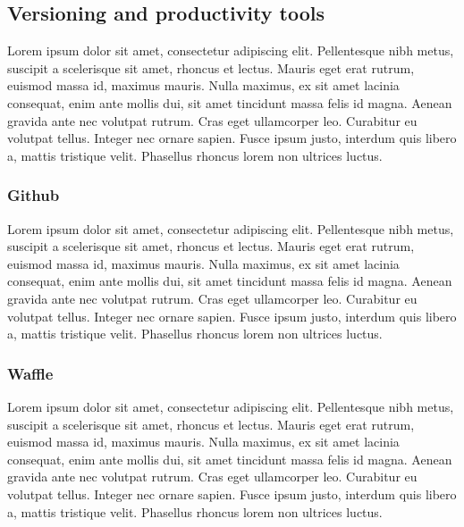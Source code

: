 \subsection{Versioning and productivity tools}\label{subsec:versioningsystem}
Lorem ipsum dolor sit amet, consectetur adipiscing elit. Pellentesque nibh metus, suscipit a scelerisque sit amet, rhoncus et lectus. Mauris eget erat rutrum, euismod massa id, maximus mauris. Nulla maximus, ex sit amet lacinia consequat, enim ante mollis dui, sit amet tincidunt massa felis id magna. Aenean gravida ante nec volutpat rutrum. Cras eget ullamcorper leo. Curabitur eu volutpat tellus. Integer nec ornare sapien. Fusce ipsum justo, interdum quis libero a, mattis tristique velit. Phasellus rhoncus lorem non ultrices luctus.

\subsubsection{Github}
Lorem ipsum dolor sit amet, consectetur adipiscing elit. Pellentesque nibh metus, suscipit a scelerisque sit amet, rhoncus et lectus. Mauris eget erat rutrum, euismod massa id, maximus mauris. Nulla maximus, ex sit amet lacinia consequat, enim ante mollis dui, sit amet tincidunt massa felis id magna. Aenean gravida ante nec volutpat rutrum. Cras eget ullamcorper leo. Curabitur eu volutpat tellus. Integer nec ornare sapien. Fusce ipsum justo, interdum quis libero a, mattis tristique velit. Phasellus rhoncus lorem non ultrices luctus.

\subsubsection{Waffle}
Lorem ipsum dolor sit amet, consectetur adipiscing elit. Pellentesque nibh metus, suscipit a scelerisque sit amet, rhoncus et lectus. Mauris eget erat rutrum, euismod massa id, maximus mauris. Nulla maximus, ex sit amet lacinia consequat, enim ante mollis dui, sit amet tincidunt massa felis id magna. Aenean gravida ante nec volutpat rutrum. Cras eget ullamcorper leo. Curabitur eu volutpat tellus. Integer nec ornare sapien. Fusce ipsum justo, interdum quis libero a, mattis tristique velit. Phasellus rhoncus lorem non ultrices luctus.
